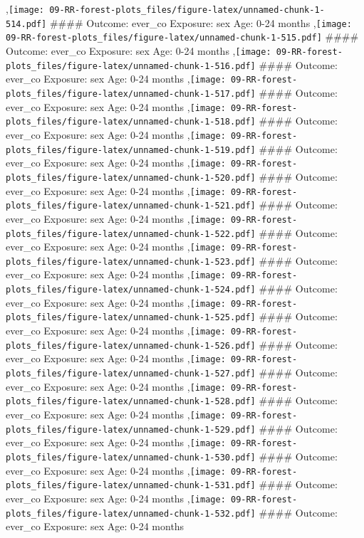 \documentclass[
  9pt,
]{book}
\begin{document}
,\texttt{[image: 09-RR-forest-plots\_files/figure-latex/unnamed-chunk-1-514.pdf]}
\#\#\#\# Outcome: ever\_co Exposure: sex Age: 0-24 months
,\texttt{[image: 09-RR-forest-plots\_files/figure-latex/unnamed-chunk-1-515.pdf]}
\#\#\#\# Outcome: ever\_co Exposure: sex Age: 0-24 months
,\texttt{[image: 09-RR-forest-plots\_files/figure-latex/unnamed-chunk-1-516.pdf]}
\#\#\#\# Outcome: ever\_co Exposure: sex Age: 0-24 months
,\texttt{[image: 09-RR-forest-plots\_files/figure-latex/unnamed-chunk-1-517.pdf]}
\#\#\#\# Outcome: ever\_co Exposure: sex Age: 0-24 months
,\texttt{[image: 09-RR-forest-plots\_files/figure-latex/unnamed-chunk-1-518.pdf]}
\#\#\#\# Outcome: ever\_co Exposure: sex Age: 0-24 months
,\texttt{[image: 09-RR-forest-plots\_files/figure-latex/unnamed-chunk-1-519.pdf]}
\#\#\#\# Outcome: ever\_co Exposure: sex Age: 0-24 months
,\texttt{[image: 09-RR-forest-plots\_files/figure-latex/unnamed-chunk-1-520.pdf]}
\#\#\#\# Outcome: ever\_co Exposure: sex Age: 0-24 months
,\texttt{[image: 09-RR-forest-plots\_files/figure-latex/unnamed-chunk-1-521.pdf]}
\#\#\#\# Outcome: ever\_co Exposure: sex Age: 0-24 months
,\texttt{[image: 09-RR-forest-plots\_files/figure-latex/unnamed-chunk-1-522.pdf]}
\#\#\#\# Outcome: ever\_co Exposure: sex Age: 0-24 months
,\texttt{[image: 09-RR-forest-plots\_files/figure-latex/unnamed-chunk-1-523.pdf]}
\#\#\#\# Outcome: ever\_co Exposure: sex Age: 0-24 months
,\texttt{[image: 09-RR-forest-plots\_files/figure-latex/unnamed-chunk-1-524.pdf]}
\#\#\#\# Outcome: ever\_co Exposure: sex Age: 0-24 months
,\texttt{[image: 09-RR-forest-plots\_files/figure-latex/unnamed-chunk-1-525.pdf]}
\#\#\#\# Outcome: ever\_co Exposure: sex Age: 0-24 months
,\texttt{[image: 09-RR-forest-plots\_files/figure-latex/unnamed-chunk-1-526.pdf]}
\#\#\#\# Outcome: ever\_co Exposure: sex Age: 0-24 months
,\texttt{[image: 09-RR-forest-plots\_files/figure-latex/unnamed-chunk-1-527.pdf]}
\#\#\#\# Outcome: ever\_co Exposure: sex Age: 0-24 months
,\texttt{[image: 09-RR-forest-plots\_files/figure-latex/unnamed-chunk-1-528.pdf]}
\#\#\#\# Outcome: ever\_co Exposure: sex Age: 0-24 months
,\texttt{[image: 09-RR-forest-plots\_files/figure-latex/unnamed-chunk-1-529.pdf]}
\#\#\#\# Outcome: ever\_co Exposure: sex Age: 0-24 months
,\texttt{[image: 09-RR-forest-plots\_files/figure-latex/unnamed-chunk-1-530.pdf]}
\#\#\#\# Outcome: ever\_co Exposure: sex Age: 0-24 months
,\texttt{[image: 09-RR-forest-plots\_files/figure-latex/unnamed-chunk-1-531.pdf]}
\#\#\#\# Outcome: ever\_co Exposure: sex Age: 0-24 months
,\texttt{[image: 09-RR-forest-plots\_files/figure-latex/unnamed-chunk-1-532.pdf]}
\#\#\#\# Outcome: ever\_co Exposure: sex Age: 0-24 months
\end{document}
